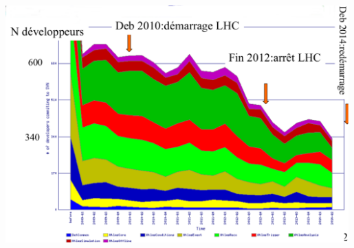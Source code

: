 \documentclass[9pt]{beamer}
\begin{document}
{\begin{columns}
\begin{column}{0.5\textwidth}
      \begin{center}
        \includegraphics[width=0.99\textwidth]{figs/atlassw-commits.pdf}
      \end{center}
    \end{column}
  \end{columns}
  
}

\end{document}
